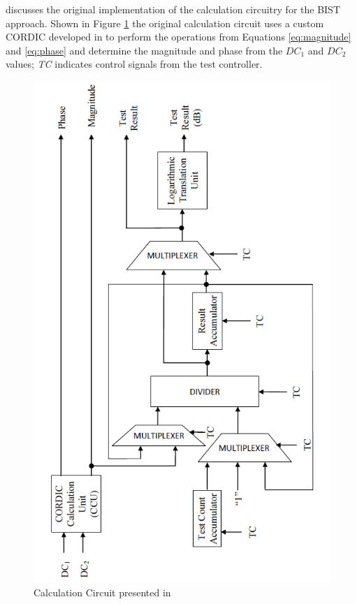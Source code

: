 \documentclass[12pt]{report}
\begin{document}
\cite{joey} discusses the original implementation of the calculation circuitry for the BIST approach.  Shown in Figure \ref{fig:joeycalc} the original calculation circuit uses a custom CORDIC developed in \cite{joey} to perform the operations from Equations \ref{eq:magnitude} and \ref{eq:phase} and determine the magnitude and phase from the $DC_1$ and $DC_2$ values; \textit{TC} indicates control signals from the test controller.
\begin{figure}
	\begin{center}
		\includegraphics[scale=1]{images/joey-calculation}
	\end{center}
	\caption{Calculation Circuit presented in \cite{joey}}
	\label{fig:joeycalc}
\end{figure}
\end{document}
